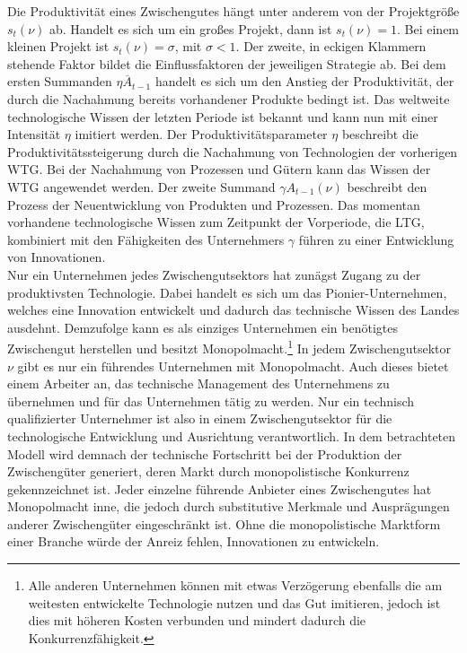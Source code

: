 Die Produktivität eines Zwischengutes hängt unter anderem von der Projektgrö{\ss}e $s_t(\nu)$ ab. Handelt es sich um ein gro{\ss}es Projekt, dann ist $s_t(\nu)=1$. Bei einem kleinen Projekt ist $s_t(\nu)=\sigma$, mit $\sigma<1$.
Der zweite, in eckigen Klammern stehende Faktor bildet die Einflussfaktoren der jeweiligen Strategie ab. Bei dem ersten Summanden $\eta\overline{A}_{t-1}$ handelt es sich um den Anstieg der Produktivität, der durch die Nachahmung bereits vorhandener Produkte bedingt ist. Das weltweite technologische Wissen der letzten Periode ist bekannt und kann nun mit einer Intensität $\eta$ imitiert werden. Der Produktivitätsparameter $\eta$ beschreibt die Produktivitätssteigerung durch die Nachahmung von Technologien der vorherigen WTG. Bei der Nachahmung von Prozessen und Gütern kann das Wissen der WTG angewendet werden. Der zweite Summand $\gamma A_{t-1}(\nu)$ beschreibt den Prozess der Neuentwicklung von Produkten und Prozessen. Das momentan vorhandene technologische Wissen zum Zeitpunkt der Vorperiode, die LTG, kombiniert mit den Fähigkeiten des Unternehmers $\gamma$ führen zu einer Entwicklung von Innovationen. \\


Nur ein Unternehmen jedes Zwischengutsektors hat zunägst Zugang zu der produktivsten Technologie.
Dabei handelt es sich um das Pionier-Unternehmen, welches eine Innovation entwickelt und dadurch das technische Wissen des Landes ausdehnt.  Demzufolge kann es als einziges Unternehmen ein benötigtes Zwischengut herstellen und besitzt Monopolmacht.\footnote{Alle anderen Unternehmen können mit etwas Verzögerung ebenfalls die am weitesten entwickelte Technologie nutzen und das Gut imitieren, jedoch ist dies mit höheren Kosten verbunden und mindert dadurch die Konkurrenzfähigkeit.} In jedem Zwischengutsektor $\nu$ gibt es nur ein führendes Unternehmen mit Monopolmacht. Auch dieses bietet einem Arbeiter an, das technische Management des Unternehmens zu übernehmen und für das Unternehmen tätig zu werden. Nur ein technisch qualifizierter Unternehmer ist also in einem Zwischengutsektor für die technologische Entwicklung  und Ausrichtung verantwortlich.\newline
In dem betrachteten Modell wird demnach der technische Fortschritt bei der Produktion der Zwischengüter generiert, deren Markt durch monopolistische Konkurrenz gekennzeichnet ist. Jeder einzelne führende Anbieter eines Zwischengutes hat Monopolmacht inne, die jedoch durch substitutive Merkmale und Ausprägungen anderer Zwischengüter eingeschränkt ist. Ohne die monopolistische Marktform einer Branche würde der Anreiz fehlen, Innovationen zu entwickeln.
